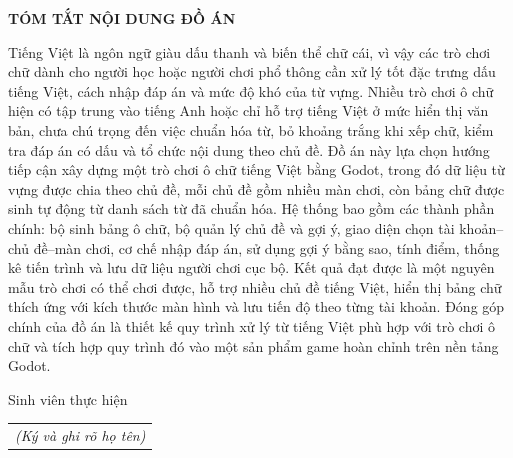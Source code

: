 \documentclass[../DoAn.tex]{subfiles}
\begin{document}
\begin{center}
    \Large{\textbf{TÓM TẮT NỘI DUNG ĐỒ ÁN}}\\
\end{center}
\vspace{1cm}
Tiếng Việt là ngôn ngữ giàu dấu thanh và biến thể chữ cái, vì vậy các trò chơi chữ dành cho người học hoặc người chơi phổ thông cần xử lý tốt đặc trưng dấu tiếng Việt, cách nhập đáp án và mức độ khó của từ vựng. Nhiều trò chơi ô chữ hiện có tập trung vào tiếng Anh hoặc chỉ hỗ trợ tiếng Việt ở mức hiển thị văn bản, chưa chú trọng đến việc chuẩn hóa từ, bỏ khoảng trắng khi xếp chữ, kiểm tra đáp án có dấu và tổ chức nội dung theo chủ đề. Đồ án này lựa chọn hướng tiếp cận xây dựng một trò chơi ô chữ tiếng Việt bằng Godot, trong đó dữ liệu từ vựng được chia theo chủ đề, mỗi chủ đề gồm nhiều màn chơi, còn bảng chữ được sinh tự động từ danh sách từ đã chuẩn hóa. Hệ thống bao gồm các thành phần chính: bộ sinh bảng ô chữ, bộ quản lý chủ đề và gợi ý, giao diện chọn tài khoản--chủ đề--màn chơi, cơ chế nhập đáp án, sử dụng gợi ý bằng sao, tính điểm, thống kê tiến trình và lưu dữ liệu người chơi cục bộ. Kết quả đạt được là một nguyên mẫu trò chơi có thể chơi được, hỗ trợ nhiều chủ đề tiếng Việt, hiển thị bảng chữ thích ứng với kích thước màn hình và lưu tiến độ theo từng tài khoản. Đóng góp chính của đồ án là thiết kế quy trình xử lý từ tiếng Việt phù hợp với trò chơi ô chữ và tích hợp quy trình đó vào một sản phẩm game hoàn chỉnh trên nền tảng Godot.
\begin{flushright}
Sinh viên thực hiện\\
\begin{tabular}{@{}c@{}}
\textit{(Ký và ghi rõ họ tên)}
\end{tabular}
\end{flushright}
\end{document}
